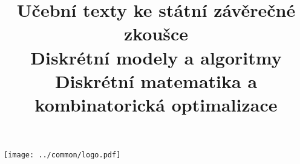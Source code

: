 \clearpage

\clearpage

\title{\LARGE Učební texty ke státní závěrečné zkoušce \\ Diskrétní modely a algoritmy \\ Diskrétní matematika a kombinatorická optimalizace}




\maketitle

\vspace{10mm}
\begin{center}
\texttt{[image: ../common/logo.pdf]}
\end{center} 

\clearpage

\clearpage

\tableofcontents







